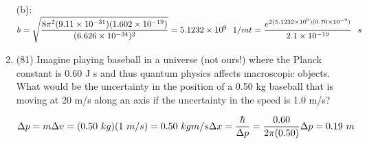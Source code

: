 \documentclass[fleqn]{article}
\begin{document}
\begin{enumerate}
    \textcolor{hwColor}{
      (b): \\
      $
        b=\sqrt{\dfrac{8 \pi^2 (9.11 \times 10^{-31})(1.602 \times 10^{-19})}{(6.626 \times 10^{-34})^2}}=5.1232 \times 10^9 ~~ 1/m \\
        \\
        t=\dfrac{e^{2(5.1232 \times 10^9)(0.70 \times 10^{-9})}}{2.1 \times 10^{-19}} ~~ s
      $
    }

    \item (81) Imagine playing baseball in a universe (not ours!) where the Planck constant is 0.60 J s and thus quantum physics affects macroscopic objects. What would be the uncertainty in the
    position of a 0.50 kg baseball that is moving at 20 m/s along an axis
    if the uncertainty in the speed is 1.0 m/s?

      \textcolor{hwColor}{
       $
        \Delta p=m \Delta v=(0.50 ~ kg)(1 ~ m/s)=0.50 ~ kgm/s \\
        \\
        \Delta x=\dfrac{\hbar}{\Delta p}=\dfrac{0.60}{2 \pi(0.50)} \\
        \\
        \Delta p=0.19 ~ m
       $
      }

  \end{enumerate}
\end{document}
